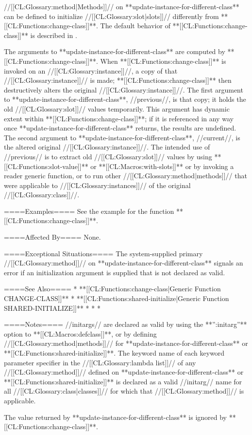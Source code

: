 //[[CL:Glossary:method|Methods]]// on **update-instance-for-different-class** can be defined to initialize //[[CL:Glossary:slot|slots]]// differently from **[[CL:Functions:change-class]]**. The default behavior of **[[CL:Functions:change-class]]** is described in \secref\ChangingInstanceClass.

The arguments to **update-instance-for-different-class** are computed by **[[CL:Functions:change-class]]**. When **[[CL:Functions:change-class]]** is invoked on an //[[CL:Glossary:instance]]//, a copy of that //[[CL:Glossary:instance]]// is made; **[[CL:Functions:change-class]]** then destructively alters the original //[[CL:Glossary:instance]]//. The first argument to **update-instance-for-different-class**, //previous//, is that copy; it holds the old //[[CL:Glossary:slot]]// values temporarily. This argument has dynamic extent within **[[CL:Functions:change-class]]**; if it is referenced in any way once **update-instance-for-different-class** returns, the results are undefined. The second argument to **update-instance-for-different-class**, //current//, is the altered original //[[CL:Glossary:instance]]//. The intended use of //previous// is to extract old //[[CL:Glossary:slot]]// values by using **[[CL:Functions:slot-value]]** or **[[CL:Macros:with-slots]]** or by invoking a reader generic function, or to run other //[[CL:Glossary:method|methods]]// that were applicable to //[[CL:Glossary:instances]]// of the original //[[CL:Glossary:class]]//.

====Examples====
See the example for the function **[[CL:Functions:change-class]]**.

====Affected By====
None.

====Exceptional Situations====
The system-supplied primary //[[CL:Glossary:method]]// on **update-instance-for-different-class** signals an error if an initialization argument is supplied that is not declared as valid.

====See Also====
  * **[[CL:Functions:change-class|Generic Function CHANGE-CLASS]]**
  * **[[CL:Functions:shared-initialize|Generic Function SHARED-INITIALIZE]]**
  * {\secref\ChangingInstanceClass}
  * {\secref\InitargRules}
  * {\secref\DeclaringInitargValidity}

====Notes====
//initargs// are declared as valid by using the **'':initarg''** option to **[[CL:Macros:defclass]]**, or by defining //[[CL:Glossary:method|methods]]// for **update-instance-for-different-class** or **[[CL:Functions:shared-initialize]]**. The keyword name of each keyword parameter specifier in the //[[CL:Glossary:lambda list]]// of any //[[CL:Glossary:method]]// defined on **update-instance-for-different-class** or **[[CL:Functions:shared-initialize]]** is declared as a valid //initarg// name for all //[[CL:Glossary:class|classes]]// for which that //[[CL:Glossary:method]]// is applicable.

The value returned by **update-instance-for-different-class** is ignored by **[[CL:Functions:change-class]]**.

